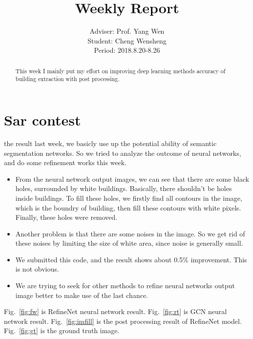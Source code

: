 \documentclass[]{IEEEtran}
\begin{document}
	\title{Weekly Report}
	\author{Adviser: Prof. Yang Wen \\Student: Cheng Wensheng\\ Period: 2018.8.20-8.26
	}
	\maketitle

\begin{abstract}
	This week I mainly put my effort on improving deep learning methods accuracy of building extraction with post processing.
\end{abstract}

\section{Sar contest}
	 the result last week, we basicly use up the potential ability of semantic segmentation networks. So we tried to analyze the outcome of neural networks, and do some refinement works this week.	
	\begin{itemize}
		\item From the neural network output images, we can see that there are some black holes, surrounded by white buildings. Basically, there shouldn't be holes inside buildings. To fill these holes, we firstly find all contours in the image, which is the boundry of building, then fill these contours with white pixels. Finally, these holes were removed.
		\item Another problem is that there are some noises in the image. So we get rid of these noises by limiting the size of white area, since noise is generally small.
		\item We submitted this code, and the result shows about 0.5$\%$ improvement. This is not obvious.
		\item We are trying to seek for other methods to refine neural networks output image better to make use of the last chance.
	\end{itemize}
	
	Fig.~\ref{fig:fw} is RefineNet neural network result. Fig.~\ref{fig:rt} is GCN neural network result. Fig.~\ref{fig:imfill} is the post processing result of RefineNet model. Fig.~\ref{fig:gt} is the ground truth image.
	
\end{document}
